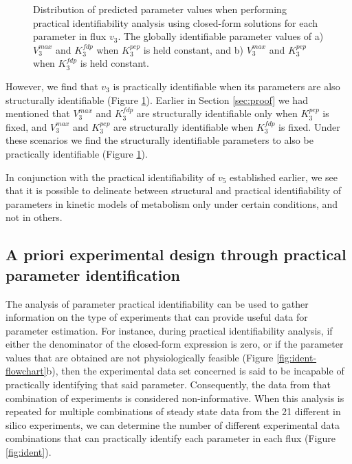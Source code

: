 \documentclass[10pt]{article}
\begin{document}
	\begin{figure}[!tbhp]
		\caption{Distribution of predicted parameter values when performing practical identifiability analysis using closed-form solutions for each parameter in flux $v_3$. The globally identifiable parameter values of a)  $V_3^{max}$ and $K_3^{fdp}$ when $K_3^{pep}$ is held constant, and b) $V_3^{max}$ and $K_3^{pep}$ when $K_3^{fdp}$ is held constant.}\label{fig:v3_var_ck_values}
	\end{figure}	

	However, we find that $v_3$ is practically identifiable when its parameters are also structurally identifiable (Figure \ref{fig:v3_var_ck_values}). Earlier in Section \ref{sec:proof} we had mentioned that $V_3^{max}$ and $K_3^{fdp}$ are structurally identifiable only when $K_3^{pep}$ is fixed, and $V_3^{max}$ and $K_3^{pep}$ are structurally identifiable when $K_3^{fdp}$ is fixed. Under these scenarios we find the structurally identifiable parameters to also be practically identifiable (Figure \ref{fig:v3_var_ck_values}).	
	
	In conjunction with the practical identifiability of $v_5$ established earlier, we see that it is possible to delineate between structural and practical identifiability of parameters in kinetic models of metabolism only under certain conditions, and not in others.
	
	\subsection{A priori experimental design through practical parameter identification}\label{sec:design}	
	The analysis of parameter practical identifiability can be used to gather information on the type of experiments that can provide useful data for parameter estimation. For instance, during practical identifiability analysis, if either the denominator of the closed-form expression is zero, or if the parameter values that are obtained are not physiologically feasible (Figure \ref{fig:ident-flowchart}b), then the experimental data set concerned is said to be incapable of practically identifying that said parameter. Consequently, the data from that combination of experiments is considered non-informative. When this analysis is repeated for multiple combinations of steady state data from the 21 different in silico experiments, we can determine the number of different experimental data combinations that can practically identify each parameter in each flux (Figure \ref{fig:ident}).
	
\end{document}
